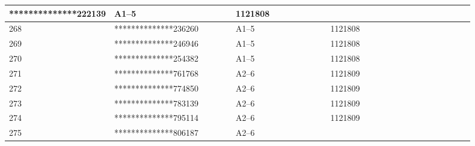 \documentclass[UTF8,10pt,a4paper,fontset=fandol]{ctexart}
\newcommand{\fieldvalue}[1]{#1}
\begin{document}
\begin{center}
\begin{tabular}{|p{0.07\linewidth}|p{0.27\linewidth}|p{0.22\linewidth}|p{0.18\linewidth}|p{0.16\linewidth}|}
\fieldvalue{**************222139} &
\fieldvalue{A1--5} &
\fieldvalue{1121808} & \\ \hline
268 &
\fieldvalue{**************236260} &
\fieldvalue{A1--5} &
\fieldvalue{1121808} & \\ \hline
269 &
\fieldvalue{**************246946} &
\fieldvalue{A1--5} &
\fieldvalue{1121808} & \\ \hline
270 &
\fieldvalue{**************254382} &
\fieldvalue{A1--5} &
\fieldvalue{1121808} & \\ \hline
271 &
\fieldvalue{**************761768} &
\fieldvalue{A2--6} &
\fieldvalue{1121809} & \\ \hline
272 &
\fieldvalue{**************774850} &
\fieldvalue{A2--6} &
\fieldvalue{1121809} & \\ \hline
273 &
\fieldvalue{**************783139} &
\fieldvalue{A2--6} &
\fieldvalue{1121809} & \\ \hline
274 &
\fieldvalue{**************795114} &
\fieldvalue{A2--6} &
\fieldvalue{1121809} & \\ \hline
275 &
\fieldvalue{**************806187} &
\fieldvalue{A2--6} &

\end{tabular}
\end{center}
\end{document}
